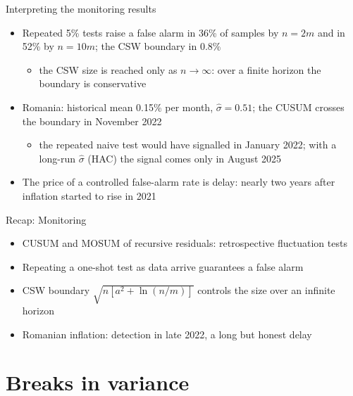 \begin{frame}{Interpreting the monitoring results}
\itemsize{\small}
\begin{itemize}
    \item Repeated 5\% tests raise a false alarm in 36\% of samples by $n = 2m$ and in 52\% by $n = 10m$; the CSW boundary in 0.8\%
    \begin{itemize}
        \item the CSW size is reached only as $n \to \infty$: over a finite horizon the boundary is conservative
    \end{itemize}
    \item Romania: historical mean 0.15\% per month, $\hat\sigma = 0.51$; the CUSUM crosses the boundary in November 2022
    \begin{itemize}
        \item the repeated naive test would have signalled in January 2022; with a long-run $\hat\sigma$ (HAC) the signal comes only in August 2025
    \end{itemize}
    \item The price of a controlled false-alarm rate is delay: nearly two years after inflation started to rise in 2021
\end{itemize}
\end{frame}

\begin{frame}{Recap: Monitoring}
\itemsize{\small}
\begin{itemize}
    \item CUSUM and MOSUM of recursive residuals: retrospective fluctuation tests
    \item Repeating a one-shot test as data arrive guarantees a false alarm
    \item CSW boundary $\sqrt{n[a^2 + \ln(n/m)]}$ controls the size over an infinite horizon
    \item Romanian inflation: detection in late 2022, a long but honest delay
\end{itemize}
\end{frame}


\section{Breaks in variance}

